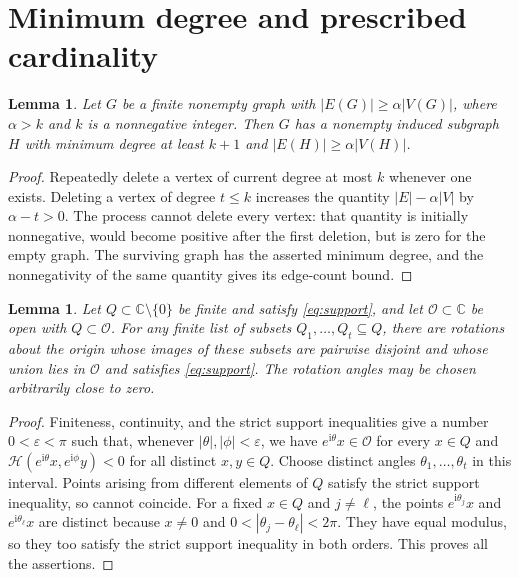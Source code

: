 \documentclass[a4paper,11pt]{amsart}
\newtheorem{lemma}[theorem]{Lemma}
\theoremstyle{remark}
\newcommand{\C}{\mathbb C}
\newcommand{\ii}{\mathrm i}
\newcommand{\Hh}{\mathcal H}
\begin{document}
\section{Minimum degree and prescribed cardinality}

\begin{lemma}\label{lem:deletion}
Let $G$ be a finite nonempty graph with
$|E(G)|\ge\alpha|V(G)|$, where $\alpha>k$ and $k$ is a nonnegative
integer. Then $G$ has a nonempty induced subgraph $H$ with minimum
degree at least $k+1$ and $|E(H)|\ge\alpha|V(H)|$.
\end{lemma}

\begin{proof}
Repeatedly delete a vertex of current degree at most $k$ whenever one
exists. Deleting a vertex of degree $t\le k$ increases the quantity
$|E|-\alpha|V|$ by $\alpha-t>0$.
The process cannot delete every vertex: that quantity is initially
nonnegative, would become positive after the first deletion, but is
zero for the empty graph.
The surviving graph has the asserted minimum degree, and the
nonnegativity of the same quantity gives its edge-count bound.
\end{proof}

\begin{lemma}\label{lem:copies}
Let $Q\subset\C\setminus\{0\}$ be finite and satisfy
\eqref{eq:support}, and let $\mathcal O\subset\C$ be open with
$Q\subset\mathcal O$.
For any finite list of subsets $Q_1,\ldots,Q_t\subseteq Q$, there are
rotations about the origin whose images of these subsets are pairwise
disjoint and whose union lies in $\mathcal O$ and satisfies
\eqref{eq:support}.
The rotation angles may be chosen arbitrarily close to zero.
\end{lemma}

\begin{proof}
Finiteness, continuity, and the strict support inequalities give a
number $0<\varepsilon<\pi$ such that, whenever $|\theta|,|\phi|<\varepsilon$,
we have $e^{\ii\theta}x\in\mathcal O$ for every $x\in Q$ and
$\Hh(e^{\ii\theta}x,e^{\ii\phi}y)<0$ for all distinct $x,y\in Q$.
Choose distinct angles $\theta_1,\ldots,\theta_t$ in this interval.
Points arising from different elements of $Q$ satisfy the strict
support inequality, so cannot coincide.
For a fixed $x\in Q$ and $j\ne\ell$, the points
$e^{\ii\theta_j}x$ and $e^{\ii\theta_\ell}x$ are distinct because
$x\ne0$ and $0<|\theta_j-\theta_\ell|<2\pi$.
They have equal modulus, so they too satisfy the strict support
inequality in both orders. This proves all the assertions.
\end{proof}
\end{document}

